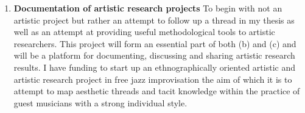 \documentclass[a4paper]{article}
\begin{document}
\begin{enumerate}[label=(\emph{\alph*})]
\item \textbf{Documentation of artistic research projects} To begin with not an artistic project but rather an attempt to follow up a thread in my thesis as well as an attempt at providing useful methodological tools to artistic researchers. This project will form an essential part of both (b) and (c) and will be a platform for documenting, discussing and sharing artistic research results. I have funding to start up an ethnographically oriented artistic and artistic research project in free jazz improvisation the aim of which it is to attempt to map aesthetic threads and tacit knowledge within the practice of guest musicians with a strong individual style.
\end{enumerate}


% 

% 

% 


\printbibliography
\end{document}
